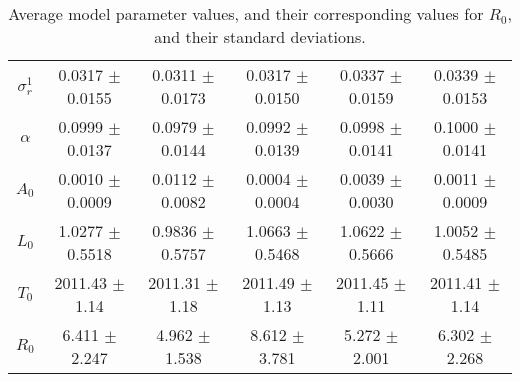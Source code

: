 \begin{sidewaystable}
\begin{tabular}{cccccc}
{\bf $\sigma^1_r$} & 0.0317 $\pm$ 0.0155 & 0.0311 $\pm$ 0.0173 & 0.0317 $\pm$ 0.0150 & 0.0337 $\pm$ 0.0159 & 0.0339 $\pm$ 0.0153 \\
{\bf $\alpha$} & 0.0999 $\pm$ 0.0137 & 0.0979 $\pm$ 0.0144 & 0.0992 $\pm$ 0.0139 & 0.0998 $\pm$ 0.0141 & 0.1000 $\pm$ 0.0141 \\
{\bf $A_0$} & 0.0010 $\pm$ 0.0009 & 0.0112 $\pm$ 0.0082 & 0.0004 $\pm$ 0.0004 & 0.0039 $\pm$ 0.0030 & 0.0011 $\pm$ 0.0009 \\
{\bf $L_0$} & 1.0277 $\pm$ 0.5518 & 0.9836 $\pm$ 0.5757 & 1.0663 $\pm$ 0.5468 & 1.0622 $\pm$ 0.5666 & 1.0052 $\pm$ 0.5485 \\
{\bf $T_0$} & 2011.43 $\pm$ 1.14 & 2011.31 $\pm$ 1.18 & 2011.49 $\pm$ 1.13 & 2011.45 $\pm$ 1.11 & 2011.41 $\pm$ 1.14 \\
{\bf $R_0$} & 6.411 $\pm$ 2.247& 4.962 $\pm$ 1.538& 8.612 $\pm$ 3.781& 5.272 $\pm$ 2.001& 6.302 $\pm$ 2.268\\
\hline\hline
\end{tabular}
\caption{Average model parameter values, and their corresponding values for $R_0$,  and their standard deviations.}
\label{Table:Parameter_Values}
\end{sidewaystable}
